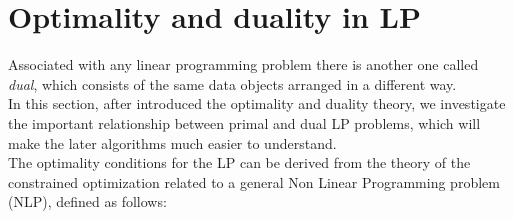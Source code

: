 \documentclass[a4paper,10 pt,titlepage,twoside]{book}
\theoremstyle{plain}
\theoremstyle{definition}
\newtheorem{ex}[thm]{Example}
\theoremstyle{remark}
\begin{document}

\section{Optimality and duality in LP}
Associated with any linear programming problem there is another one called \textit{dual}, which consists of the same data objects arranged in a different way.\\In this section, after introduced the optimality and duality theory, we investigate the important relationship between primal and dual LP problems, which will make the later algorithms
much easier to understand.\\ 
The optimality conditions for the LP can be derived from the theory of the constrained optimization related to a general Non Linear Programming problem (NLP), defined as follows:
\end{document}
